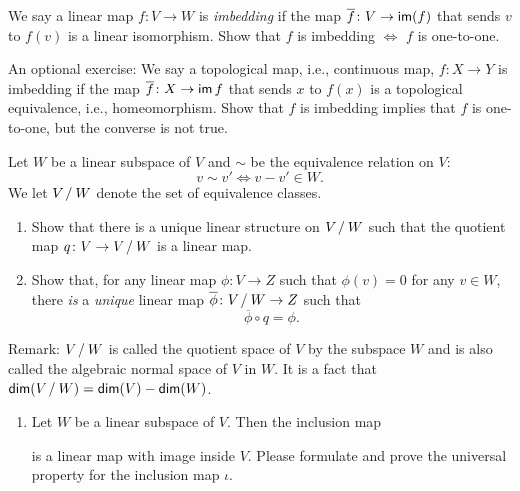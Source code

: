\begin{problem}
We say a linear map $f \colon V \to W$ is \emph{imbedding} if the map $\overline{f} \colon V \to \operatorname{\text{\normalfont\sffamily im}}(f)$ that sends $v$ to $f(v)$ is a linear isomorphism. Show that $f$ is imbedding $\iff$ $f$ is one-to-one.

An optional exercise: We say a topological map, i.e., continuous map, $f \colon X \to Y$ is imbedding if the map $\overline{f} \colon X \to \operatorname{\text{\normalfont\sffamily im}} f$ that sends $x$ to $f(x)$ is a topological equivalence, i.e., homeomorphism. Show that $f$ is imbedding implies that $f$ is one-to-one, but the converse is not true.
\end{problem}

\begin{problem}
Let $W$ be a linear subspace of $V$ and $\sim$ be the equivalence relation on $V$:
\[
  v \sim v' \iff v - v' \in W.
\]
We let $V \mathbin{/} W$ denote the set of equivalence classes.
\begin{enumerate}
  \item Show that there is a unique linear structure on $V \mathbin{/} W$ such that the quotient map $q \colon V \to V \mathbin{/} W$ is a linear map.
  \item Show that, for any linear map $\phi \colon V \to Z$ such that $\phi(v) = 0$ for any $v \in W$, there \emph{is} a \emph{unique} linear map $\overline{\phi} \colon V \mathbin{/} W \to Z$ such that \[ \overline{\phi} \circ q = \phi. \]
\end{enumerate}
Remark: $V \mathbin{/} W$ is called the quotient space of $V$ by the subspace $W$ and is also called the algebraic normal space of $V$ in $W$. It is a fact that $\operatorname{\text{\normalfont\sffamily dim}}(V \mathbin{/} W) = \operatorname{\text{\normalfont\sffamily dim}}(V) - \operatorname{\text{\normalfont\sffamily dim}}(W)$.
\begin{enumerate}[resume]
  \item Let $W$ be a linear subspace of $V$. Then the inclusion map  is a linear map with image inside $V$. Please formulate and prove the universal property for the inclusion map $\iota$.
\end{enumerate}
\end{problem}

